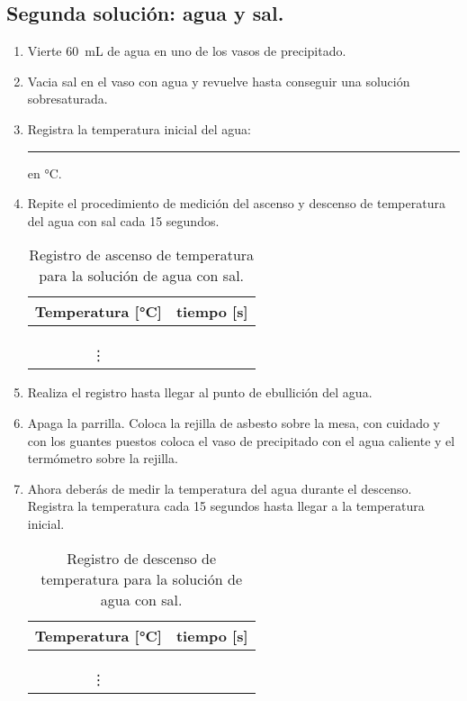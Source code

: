 \documentclass[14pt]{extarticle}
\begin{document}
\subsection{Segunda solución: agua y sal.}

\begin{enumerate}
\item Vierte \SI{60}{\milli\liter} de agua en uno de los vasos de precipitado.
\item Vacia sal en el vaso con agua y revuelve hasta conseguir una solución sobresaturada.
\item Registra la temperatura inicial del agua: \rule{2cm}{0.1mm} en \si{\degreeCelsius}.
\item Repite el procedimiento de medición del ascenso y descenso de temperatura del agua con sal cada \num{15} segundos.
\begin{table}[H]
\centering
\begin{tabular}{| c | c |} \hline
Temperatura [\si{\degreeCelsius}] & tiempo [\si{\second}] \\ \hline
 & \\ \hline
 & \\ \hline
 & \\ \hline
\vdots & \\ \hline
\end{tabular}
\caption{Registro de ascenso de temperatura para la solución de agua con sal.}
\end{table}
\item Realiza el registro hasta llegar al punto de ebullición del agua.
\item Apaga la parrilla. Coloca la rejilla de asbesto sobre la mesa, con cuidado y con los guantes puestos coloca el vaso de precipitado con el agua caliente y el termómetro sobre la rejilla.
\item Ahora deberás de medir la temperatura del agua durante el descenso. Registra la temperatura cada \num{15} segundos hasta llegar a la temperatura inicial.
\begin{table}[H]
\centering
\begin{tabular}{| c | c |} \hline
Temperatura [\si{\degreeCelsius}] & tiempo [\si{\second}] \\ \hline
 & \\ \hline
 & \\ \hline
 & \\ \hline
\vdots & \\ \hline
\end{tabular}
\caption{Registro de descenso de temperatura para la solución de agua con sal.}
\end{table}
\end{enumerate}
\end{document}
